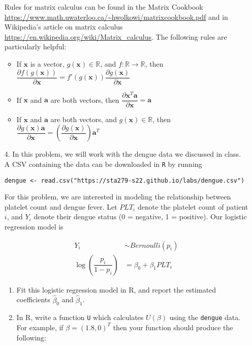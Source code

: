 \documentclass[11pt]{article}
\begin{document}
\begin{enumerate}
Rules for matrix calculus can be found in the Matrix Cookbook \url{https://www.math.uwaterloo.ca/~hwolkowi/matrixcookbook.pdf} and in Wikipedia's article on matrix calculus \url{https://en.wikipedia.org/wiki/Matrix_calculus}. The following rules are particularly helpful:
\begin{itemize}
\item If $\mathbf{x}$ is a vector, $g(\mathbf{x}) \in \mathbb{R}$, and $f: \mathbb{R} \to \mathbb{R}$, then $\dfrac{\partial f(g(\mathbf{x}))}{\partial \mathbf{x}} = f'(g(\mathbf{x})) \dfrac{\partial g(\mathbf{x})}{\partial \mathbf{x}}$
\item If $\mathbf{x}$ and $\mathbf{a}$ are both vectors, then $\dfrac{\partial \mathbf{x}^T \mathbf{a}}{\partial \mathbf{x}} = \mathbf{a}$
\item If $\mathbf{x}$ and $\mathbf{a}$ are both vectors, and $g(\mathbf{x}) \in \mathbb{R}$, then $\dfrac{\partial g(\mathbf{x}) \mathbf{a}}{\partial \mathbf{x}} = \left( \dfrac{\partial g(\mathbf{x})}{\partial \mathbf{x}} \right) \mathbf{a}^T$
\end{itemize}

\newpage

\item[4.] In this problem, we will work with the dengue data we discussed in class. A CSV containing the data can be downloaded in \texttt{R} by running
\begin{center}
\texttt{dengue <- read.csv("https://sta279-s22.github.io/labs/dengue.csv")}
\end{center}

For this problem, we are interested in modeling the relationship between platelet count and dengue fever. Let $PLT_i$ denote the platelet count of patient $i$, and $Y_i$ denote their dengue status (0 = negative, 1 = positive). Our logistic regression model is

\begin{align*}
Y_i &\sim Bernoulli(p_i)\\
\log \left( \dfrac{p_i}{1 - p_i} \right) &= \beta_0 + \beta_1 PLT_i
\end{align*}

\begin{enumerate}
\item Fit this logistic regression model in R, and report the estimated coefficients $\widehat{\beta}_0$ and $\widehat{\beta}_1$.
\item In R, write a function \texttt{U} which calculates $U(\beta)$ using the \texttt{dengue} data. For example, if $\beta = (1.8, 0)^T$ then your function should produce the following:


\end{enumerate}
\end{enumerate}
\end{document}
